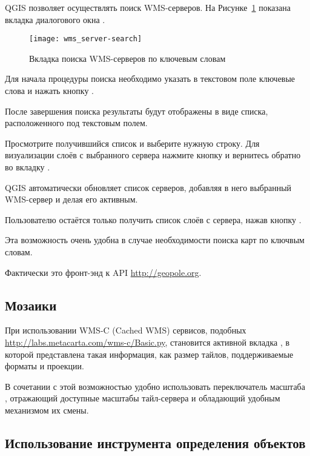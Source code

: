 QGIS позволяет осуществлять поиск WMS-серверов. На Рисунке~\ref{fig:searchtab}
показана вкладка  диалогового окна
.

\begin{figure}[ht]
  \centering
  \texttt{[image: wms\_server-search]}
  	\caption{Вкладка поиска WMS-серверов по ключевым словам
  	\nixcaption}\label{fig:searchtab}
\end{figure}

Для начала процедуры поиска необходимо указать в текстовом поле ключевые
слова и нажать кнопку .

После завершения поиска результаты будут отображены в виде списка,
расположенного под текстовым полем.

Просмотрите получившийся список и выберите нужную строку. Для визуализации
слоёв с выбранного сервера нажмите кнопку  и вернитесь обратно во вкладку .

QGIS автоматически обновляет список серверов, добавляя в него выбранный
WMS-сервер и делая его активным.

Пользователю остаётся только получить список слоёв с сервера, нажав кнопку
.

Эта возможность очень удобна в случае необходимости поиска карт по
ключвым словам.

Фактически это фронт-энд к API \url{http://geopole.org}.

%
%
\subsection{Мозаики}\label{sec:tilesets}

При использовании WMS-C (Cached WMS) сервисов, подобных
\url{http://labs.metacarta.com/wms-c/Basic.py}, становится активной вкладка
, в которой представлена такая информация, как размер
тайлов, поддерживаемые форматы и проекции.

В сочетании с этой возможностью удобно использовать переключатель масштаба
 \arrow \\
, отражающий доступные масштабы
тайл-сервера и обладающий удобным механизмом их смены.
%
%
\subsection{Использование инструмента определения
объектов}\label{sec:ogc-wms-identify}

